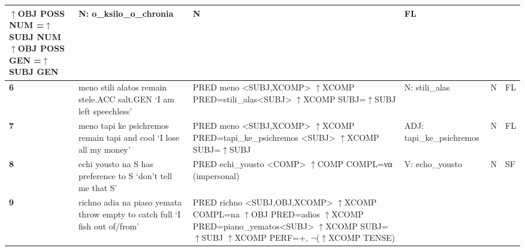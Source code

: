 \documentclass[output=paper]{langsci/langscibook}
\begin{document}
\begin{table}[htbp]
{\begin{tabular}{l@{~}p{5.6cm}p{6.4cm}p{3.3cm}ll}
  $\uparrow$OBJ POSS NUM =$\uparrow$SUBJ NUM \newline
  $\uparrow$OBJ POSS GEN =$\uparrow$SUBJ GEN
  &
  N: \newline
  o\_ksilo\_o\_chronia
  &
  N
  &
  FL
  \\
  \midrule
  \textbf{6}
  &
  meno stili alatos \newline
  remain stele.ACC salt.GEN \newline
  `I am left speechless’
  &
  PRED meno <SUBJ,XCOMP> \newline
  $\uparrow$XCOMP PRED=stili\_alas<SUBJ> \newline
  $\uparrow$XCOMP SUBJ=$\uparrow$SUBJ
  &
  N: \newline
  stili\_alas
  &
  N
  &
  FL
  \\
  \midrule
  \textbf{7}
  &
  meno tapi ke psichremos \newline
  remain tapi and cool \newline
  `I lose all my money’
  &
  PRED meno <SUBJ,XCOMP> \newline
  $\uparrow$XCOMP PRED=tapi\_ke\_psichremos \newline
  <SUBJ> \newline
  $\uparrow$XCOMP SUBJ=$\uparrow$SUBJ
  &
  ADJ: \newline
  tapi\_ke\_psichremos
  &
  N
  &
  FL
  \\
  \midrule
  \textbf{8}
  &
  echi yousto na S \newline
  has preference to S \newline
  `don’t tell me that S’
  &
  PRED echi\_yousto <COMP> \newline
  $\uparrow$COMP COMPL=να \newline
  (impersonal)
  &
  V: \newline
  echo\_yousto
  &
  N
  &
  SF
  \\
  \midrule
  \textbf{9}
  &
  richno adia na piaso yemata \newline
  throw empty to catch full \newline
  `I fish out of/from’
  &
  PRED richno <SUBJ,OBJ,XCOMP> \newline
  $\uparrow$XCOMP COMPL=na \newline
  $\uparrow$OBJ PRED=adios \newline
  $\uparrow$XCOMP PRED=piano\_yematos<SUBJ> \newline
  $\uparrow$XCOMP SUBJ=$\uparrow$SUBJ \newline
  $\uparrow$XCOMP PERF=+, $\neg$($\uparrow$XCOMP TENSE) 

\end{tabular}}
\end{table}
\end{document}
